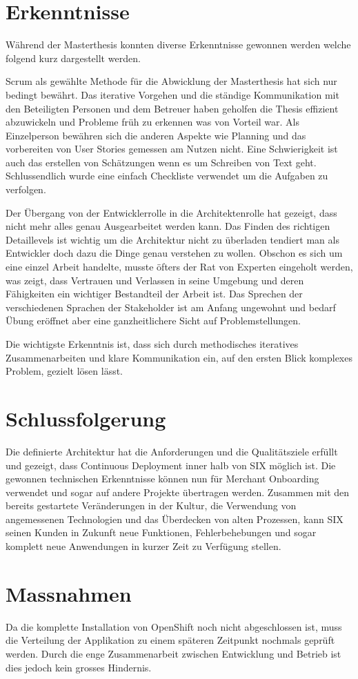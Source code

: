 \chapter{Erkenntnisse}

Während der Masterthesis konnten diverse Erkenntnisse gewonnen werden welche folgend kurz dargestellt werden.\newline

Scrum als gewählte Methode für die Abwicklung der Masterthesis hat sich nur bedingt bewährt. Das iterative Vorgehen und die ständige Kommunikation mit den Beteiligten Personen und dem Betreuer haben geholfen die Thesis effizient abzuwickeln und Probleme früh zu erkennen was von Vorteil war. Als Einzelperson bewähren sich die anderen Aspekte wie Planning und das vorbereiten von User Stories gemessen am Nutzen nicht. Eine Schwierigkeit ist auch das erstellen von Schätzungen wenn es um Schreiben von Text geht. Schlussendlich wurde eine einfach Checkliste verwendet um die Aufgaben zu verfolgen.\newline

Der Übergang von der Entwicklerrolle in die Architektenrolle hat gezeigt, dass nicht mehr alles genau Ausgearbeitet werden kann. Das Finden des richtigen Detaillevels ist wichtig um die Architektur nicht zu überladen tendiert man als Entwickler doch dazu die Dinge genau verstehen zu wollen. Obschon es sich um eine einzel Arbeit handelte, musste öfters der Rat von Experten eingeholt werden, was zeigt, dass Vertrauen und Verlassen in seine Umgebung und deren Fähigkeiten ein wichtiger Bestandteil der Arbeit ist. Das Sprechen der verschiedenen Sprachen der Stakeholder ist am Anfang ungewohnt und bedarf Übung eröffnet aber eine ganzheitlichere Sicht auf Problemstellungen.\newline

Die wichtigste Erkenntnis ist, dass sich durch methodisches iteratives Zusammenarbeiten und klare Kommunikation ein, auf den ersten Blick komplexes Problem, gezielt lösen lässt.

\chapter{Schlussfolgerung}

Die definierte Architektur hat die Anforderungen und die Qualitätsziele erfüllt und gezeigt, dass Continuous Deployment inner halb von SIX möglich ist. Die gewonnen technischen Erkenntnisse können nun für Merchant Onboarding verwendet und sogar auf andere Projekte übertragen werden. Zusammen mit den bereits gestartete Veränderungen in der Kultur, die Verwendung von angemessenen Technologien und das Überdecken von alten Prozessen, kann SIX seinen Kunden in Zukunft neue Funktionen, Fehlerbehebungen und sogar komplett neue Anwendungen in kurzer Zeit zu Verfügung stellen.

\chapter{Massnahmen}

Da die komplette Installation von OpenShift noch nicht abgeschlossen ist, muss die Verteilung der Applikation zu einem späteren Zeitpunkt nochmals geprüft werden. Durch die enge Zusammenarbeit zwischen Entwicklung und Betrieb ist dies jedoch kein grosses Hindernis.